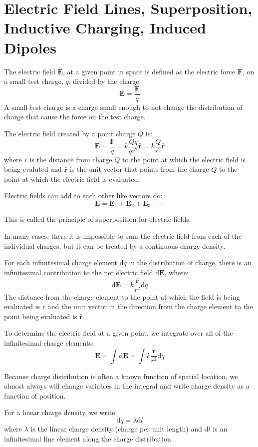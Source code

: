 \documentclass[../introphysics.tex]{subfiles}
\begin{document}
\section{Electric Field Lines, Superposition, Inductive Charging, Induced Dipoles}
The electric field $\textbf{E}$, at a given point in space is defined as the electric force 
$\textbf{F}$, on a small test charge, $q$, divided by the charge:
\[\textbf{E}=\frac{\textbf{F}}{q}\]
A small test charge is a charge small enough to not change the distribution of charge that cause the force on the test charge.

The electric field created by a point charge $Q$ is:
\[\textbf{E}=\frac{\textbf{F}}{q}=k\frac{Qq}{qr^2}\hat{\textbf{r}}=k\frac{Q}{r^2}\hat{\textbf{r}}\]
where $r$ is the distance from charge $Q$ to the point at which the electric field is 
being evaluted and $\hat{\textbf{r}}$ is the unit vector that points from the charge $Q$ to 
the point at which the electric field is evaluated.

Electric fields can add to each other like vectors do:
\[\textbf{E}=\textbf{E}_1+\textbf{E}_2+\textbf{E}_3+\cdots\]

This is called the principle of superposition for electric fields.

In many cases, there it is impossible to sum the electric field from each of 
the individual charges, but it can be treated by a continuous charge density.

For each infinitesimal charge element $\mathrm{d}q$ in the distribution of charge, 
there is an infinitesimal contribution to the net electric field $\mathrm{d}\textbf{E}$, where:
\[\mathrm{d}\textbf{E}=k\frac{\hat{\textbf{r}}}{r^2}\mathrm{d}q\]
The distance from the charge element to the point at which the field is 
being evaluated is $r$ and the unit vector in the direction from the charge 
element to the point being evaluated is $\hat{\textbf{r}}$. 

To determine the electric field at a given point, we integrate over all of the infinitesimal charge elements:
\[\textbf{E}=\int\mathrm{d}\textbf{E}=\int k\frac{\hat{\textbf{r}}}{r^2}\mathrm{d}q\]

Because charge distribution is often a known function of spatial location, we 
almost always will change variables in the integral and write charge density as a function of position. 

For a linear charge density, we write:
\[\mathrm{d}q=\lambda\mathrm{d}l\]
where $\lambda$ is the linear charge density (charge per unit length) and $\mathrm{d}l$ 
is an infinitesimal line element along the charge distribution.
\end{document}
